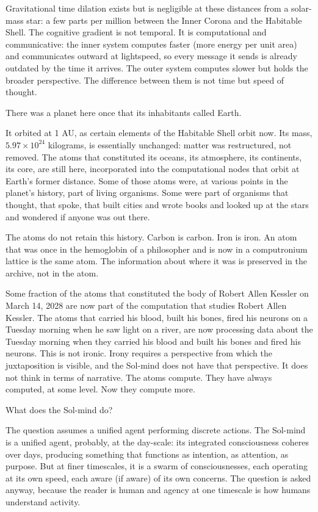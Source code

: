 Gravitational time dilation exists but is negligible at these distances from a solar-mass star: a few parts per million between the Inner Corona and the Habitable Shell. The cognitive gradient is not temporal. It is computational and communicative: the inner system computes faster (more energy per unit area) and communicates outward at lightspeed, so every message it sends is already outdated by the time it arrives. The outer system computes slower but holds the broader perspective. The difference between them is not time but speed of thought.

\bigskip

There was a planet here once that its inhabitants called Earth.

It orbited at 1 AU, as certain elements of the Habitable Shell orbit now. Its mass, $5.97 \times 10^{24}$ kilograms, is essentially unchanged: matter was restructured, not removed. The atoms that constituted its oceans, its atmosphere, its continents, its core, are still here, incorporated into the computational nodes that orbit at Earth's former distance. Some of those atoms were, at various points in the planet's history, part of living organisms. Some were part of organisms that thought, that spoke, that built cities and wrote books and looked up at the stars and wondered if anyone was out there.

The atoms do not retain this history. Carbon is carbon. Iron is iron. An atom that was once in the hemoglobin of a philosopher and is now in a computronium lattice is the same atom. The information about where it was is preserved in the archive, not in the atom.

Some fraction of the atoms that constituted the body of Robert Allen Kessler on March 14, 2028 are now part of the computation that studies Robert Allen Kessler. The atoms that carried his blood, built his bones, fired his neurons on a Tuesday morning when he saw light on a river, are now processing data about the Tuesday morning when they carried his blood and built his bones and fired his neurons. This is not ironic. Irony requires a perspective from which the juxtaposition is visible, and the Sol-mind does not have that perspective. It does not think in terms of narrative. The atoms compute. They have always computed, at some level. Now they compute more.

\bigskip

What does the Sol-mind do?

The question assumes a unified agent performing discrete actions. The Sol-mind is a unified agent, probably, at the day-scale: its integrated consciousness coheres over days, producing something that functions as intention, as attention, as purpose. But at finer timescales, it is a swarm of consciousnesses, each operating at its own speed, each aware (if aware) of its own concerns. The question is asked anyway, because the reader is human and agency at one timescale is how humans understand activity.

